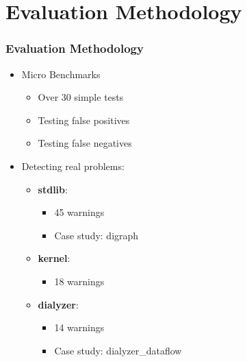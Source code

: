 \section{Evaluation Methodology}
\frametitle{Evaluation Methodology}

\begin{frame}

\begin{itemize}
	\item Micro Benchmarks
	\begin{itemize}
		\item Over 30 simple tests
		\item Testing false positives
		\item Testing false negatives
	\end{itemize}
	\item Detecting real problems:
	  \begin{itemize}
          \item \textbf{stdlib}:
            \begin{itemize}
            \item 45 warnings
            \item Case study: digraph
            \end{itemize}
          \item \textbf{kernel}:
            \begin{itemize}
            \item 18 warnings
            \end{itemize}
            \pause
          \item \textbf{dialyzer}:
            \begin{itemize}
            \item 14 warnings
            \item Case study: dialyzer\_dataflow
            \end{itemize}
	\end{itemize}
\end{itemize}

\end{frame}
